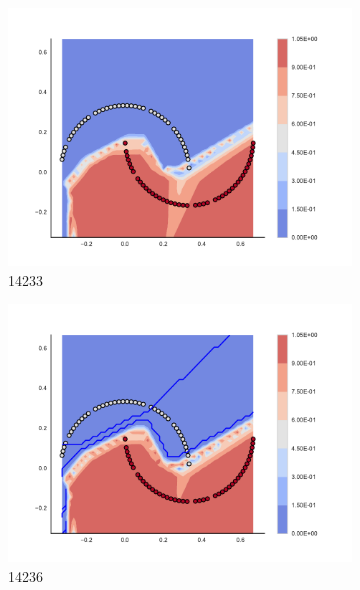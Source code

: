 \begin{figure}[h]
\begin{subfigure}[b]{0.09\textwidth}
    \includegraphics[clip, trim=2.35cm 1.75cm 4.5cm 0cm,width=\textwidth]{img/convergence/14233.pdf}
    \caption{14233}
    \label{fig:convergence_14233}
\end{subfigure}
%
\begin{subfigure}[b]{0.09\textwidth}
    \includegraphics[clip, trim=2.35cm 1.75cm 4.5cm 0cm,width=\textwidth]{img/convergence/14236.pdf}
    \caption{14236}
    \label{fig:convergence_14236}
\end{subfigure}
%
\begin{subfigure}[b]{0.09\textwidth}

\end{subfigure}
\end{figure}
